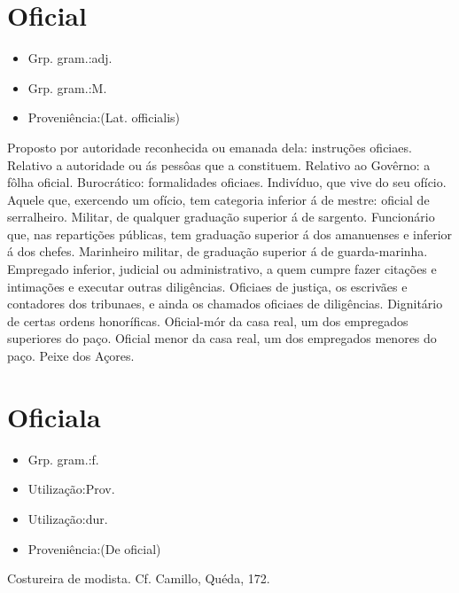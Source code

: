 \section{Oficial}
\begin{itemize}
\item {Grp. gram.:adj.}
\end{itemize}
\begin{itemize}
\item {Grp. gram.:M.}
\end{itemize}
\begin{itemize}
\item {Proveniência:(Lat. \textunderscore officialis\textunderscore )}
\end{itemize}
Proposto por autoridade reconhecida ou emanada dela: \textunderscore instruções oficiaes\textunderscore .
Relativo a autoridade ou ás pessôas que a constituem.
Relativo ao Govêrno: \textunderscore a fôlha oficial\textunderscore .
Burocrático: \textunderscore formalidades oficiaes\textunderscore .
Indivíduo, que vive do seu ofício.
Aquele que, exercendo um ofício, tem categoria inferior á de mestre: \textunderscore oficial de serralheiro\textunderscore .
Militar, de qualquer graduação superior á de sargento.
Funcionário que, nas repartições públicas, tem graduação superior á dos amanuenses e inferior á dos chefes.
Marinheiro militar, de graduação superior á de guarda-marinha.
Empregado inferior, judicial ou administrativo, a quem cumpre fazer citações e intimações e executar outras diligências.
\textunderscore Oficiaes de justiça\textunderscore , os escrivães e contadores dos tribunaes, e ainda os chamados oficiaes de diligências.
Dignitário de certas ordens honoríficas.
\textunderscore Oficial-mór da casa real\textunderscore , um dos empregados superiores do paço.
\textunderscore Oficial menor da casa real\textunderscore , um dos empregados menores do paço.
Peixe dos Açores.
\section{Oficiala}
\begin{itemize}
\item {Grp. gram.:f.}
\end{itemize}
\begin{itemize}
\item {Utilização:Prov.}
\end{itemize}
\begin{itemize}
\item {Utilização:dur.}
\end{itemize}
\begin{itemize}
\item {Proveniência:(De \textunderscore oficial\textunderscore )}
\end{itemize}
Costureira de modista. Cf. Camillo, \textunderscore Quéda\textunderscore , 172.
